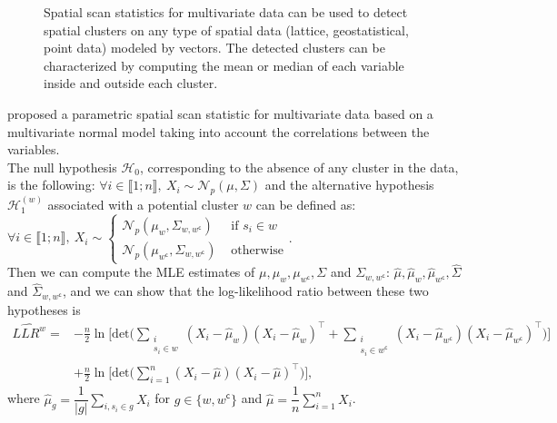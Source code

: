 \begin{figure}[h!]
{Spatial scan statistics for multivariate data can be used to detect spatial clusters on any type of spatial data (lattice, geostatistical, point data) modeled by vectors. The detected clusters can be characterized by computing the mean or median of each variable inside and outside each cluster.
}
\label{fig:schema_multi}
\end{figure}


\noindent \citet{a_multivariate_gaussian} proposed a parametric spatial scan statistic for multivariate data based on a multivariate normal model taking into account the correlations between the variables. \\
The null hypothesis $\mathcal{H}_0$, corresponding to the absence of any cluster in the data, is the
following: $\forall i \in \llbracket 1 ; n \rrbracket, \ X_i \sim \mathcal{N}_p(\mu, \Sigma)$ and the alternative hypothesis $\mathcal{H}_1^{(w)}$
associated with a potential cluster $w$ can be defined as: $\forall i \in \llbracket 1 ; n \rrbracket, \ X_i \sim \left\{ \begin{array}{ll}
\mathcal{N}_p(\mu_w, \Sigma_{w,w^\mathsf{c}}) & \text{ if } s_i \in w \\
\mathcal{N}_p(\mu_{w^\mathsf{c}}, \Sigma_{w,w^\mathsf{c}}) & \text{ otherwise}
\end{array} \right.$. \\

\noindent Then we can compute the MLE estimates of $\mu, \mu_w, \mu_{w^\mathsf{c}}, \Sigma$ and $\Sigma_{w,w^\mathsf{c}}$: $\hat{\mu}, \widehat{\mu}_w, \widehat{\mu}_{w^\mathsf{c}}, \widehat{\Sigma}$ and $\widehat{\Sigma}_{w,w^\mathsf{c}}$, and we can show that the log-likelihood ratio between these two hypotheses is
\begin{align*}
\widehat{LLR^w} = &-\frac{n}{2}\ln\bigg[\text{det}\Big(\sum_{\substack{i\\ s_i \in w}} \left(X_i - \widehat{\mu}_w \right) \left(X_i - \widehat{\mu}_w \right)^\top + \sum_{\substack{i \\ s_i \in w^\mathsf{c}}} \left(X_i - \widehat{\mu}_{w^\mathsf{c}} \right) \left(X_i - \widehat{\mu}_{w^\mathsf{c}} \right)^\top \Big)\bigg] \\
&+ \frac{n}{2}\ln\bigg[\text{det}\Big(\sum_{i=1}^{n} \left(X_i - \hat{\mu} \right) \left(X_i - \hat{\mu} \right)^\top \Big)\bigg],  
\end{align*}
where $\displaystyle{ \hat{\mu}_g = \dfrac{1}{|g|} \sum_{i, s_i \in g} X_i }$ for $g \in \{ w, w^\mathsf{c} \}$ and $ \displaystyle{  \hat{\mu} = \dfrac{1}{n} \sum_{i=1}^n X_i } $. \\

